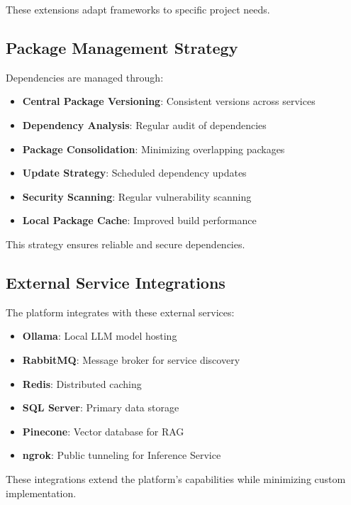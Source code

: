 These extensions adapt frameworks to specific project needs.

\subsection{Package Management Strategy}
Dependencies are managed through:
\begin{itemize}
    \item \textbf{Central Package Versioning}: Consistent versions across services
    \item \textbf{Dependency Analysis}: Regular audit of dependencies
    \item \textbf{Package Consolidation}: Minimizing overlapping packages
    \item \textbf{Update Strategy}: Scheduled dependency updates
    \item \textbf{Security Scanning}: Regular vulnerability scanning
    \item \textbf{Local Package Cache}: Improved build performance
\end{itemize}

This strategy ensures reliable and secure dependencies.

\subsection{External Service Integrations}
The platform integrates with these external services:
\begin{itemize}
    \item \textbf{Ollama}: Local LLM model hosting
    \item \textbf{RabbitMQ}: Message broker for service discovery
    \item \textbf{Redis}: Distributed caching
    \item \textbf{SQL Server}: Primary data storage
    \item \textbf{Pinecone}: Vector database for RAG
    \item \textbf{ngrok}: Public tunneling for Inference Service
\end{itemize}

These integrations extend the platform's capabilities while minimizing custom implementation.

